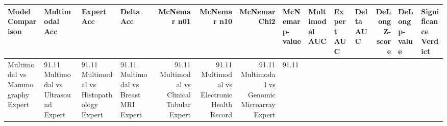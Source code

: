 \begin{tabular}{llllrrrllllrll}
\toprule
Model Comparison & Multimodal Acc & Expert Acc & Delta Acc & McNemar n01 & McNemar n10 & McNemar Chi2 & McNemar p-value & Multimodal AUC & Expert AUC & Delta AUC & DeLong Z-score & DeLong p-value & Significance Verdict \\
\midrule
Multimodal vs Mammography Expert & 91.11%
Multimodal vs Ultrasound Expert & 91.11%
Multimodal vs Histopathology Expert & 91.11%
Multimodal vs Breast MRI Expert & 91.11%
Multimodal vs Clinical Tabular Expert & 91.11%
Multimodal vs Electronic Health Record & 91.11%
Multimodal vs Genomic Microarray Expert & 91.11%
\bottomrule
\end{tabular}
